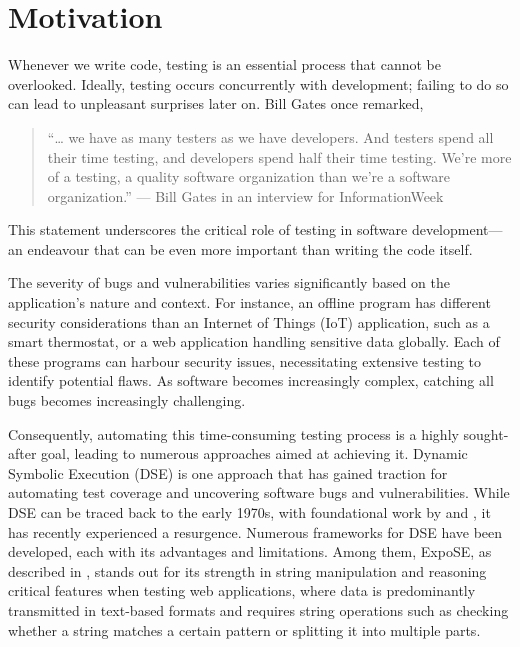 \setcounter{page}{1}
\section{Motivation}
\label{sec:motivation}

Whenever we write code, testing is an essential process that cannot be overlooked. Ideally, testing occurs concurrently with development; failing to do so can lead to unpleasant surprises later on. Bill Gates once remarked, 
\begin{quote}

    “… we have as many testers as we have developers. And testers spend all their time testing, and developers spend half their time testing. We're more of a testing, a quality software organization than we're a software organization.” — Bill Gates in an interview for InformationWeek \cite{bill_q_2002} 
\end{quote}

This statement underscores the critical role of testing in software development—an endeavour that can be even more important than writing the code itself.


The severity of bugs and vulnerabilities varies significantly based on the application's nature and context. For instance, an offline program has different security considerations than an Internet of Things (IoT) application, such as a smart thermostat, or a web application handling sensitive data globally. Each of these programs can harbour security issues, necessitating extensive testing to identify potential flaws. As software becomes increasingly complex, catching all bugs becomes increasingly challenging. 


Consequently, automating this time-consuming testing process is a highly sought-after goal, leading to numerous approaches aimed at achieving it.
Dynamic Symbolic Execution (DSE) is one approach that has gained traction for automating test coverage and uncovering software bugs and vulnerabilities. While DSE can be traced back to the early 1970s, with foundational work by \citet{boyer_selectformal_1975} and \citet{king_new_1975}, it has recently experienced a resurgence. Numerous frameworks for DSE have been developed, each with its advantages and limitations. Among them, ExpoSE, as described in \citet{loring_expose_2017}, stands out for its strength in string manipulation and reasoning critical features when testing web applications, where data is predominantly transmitted in text-based formats and requires string operations such as checking whether a string matches a certain pattern or splitting it into multiple parts.



